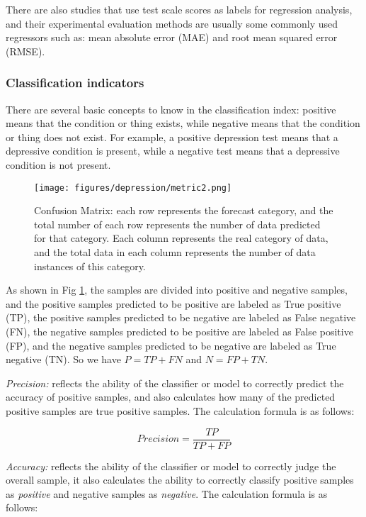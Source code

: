 There are also studies that use test scale scores as labels for regression analysis, and their experimental evaluation methods are usually some commonly used regressors such as: mean absolute error (MAE) and root mean squared error (RMSE).

\subsubsection{Classification indicators}
There are several basic concepts to know in the classification index: positive means that the condition or thing exists, while negative means that the condition or thing does not exist. For example, a positive depression test means that a depressive condition is present, while a negative test means that a depressive condition is not present.

\begin{figure}[tbp]
	\centering	
	\label{fig_hard_case1}\texttt{[image: figures/depression/metric2.png]}		
	\caption{
	Confusion Matrix: each row represents the forecast category, and the total number of each row represents the number of data predicted for that category. Each column represents the real category of data, and the total data in each column represents the number of data instances of this category.
	}
	\label{metric}
\end{figure}

As shown in Fig \ref{metric}, the samples are divided into positive and negative samples, and the positive samples predicted to be positive are labeled as True positive (TP), the positive samples predicted to be negative are labeled as False negative (FN), the negative samples predicted to be positive are labeled as False positive (FP), and the negative samples predicted to be negative are labeled as True negative (TN). So we have $P=TP+FN$ and $N=FP+TN$.

\emph{Precision:} reflects the ability of the classifier or model to correctly predict the accuracy of positive samples, and also calculates how many of the predicted positive samples are true positive samples. The calculation formula is as follows:

\begin{equation}
 Precision =\frac{TP}{TP+FP}
\end{equation}


\emph{Accuracy:} reflects the ability of the classifier or model to correctly judge the overall sample, it also calculates the ability to correctly classify positive samples as \emph{positive} and negative samples as \emph{negative}. The calculation formula is as follows:

